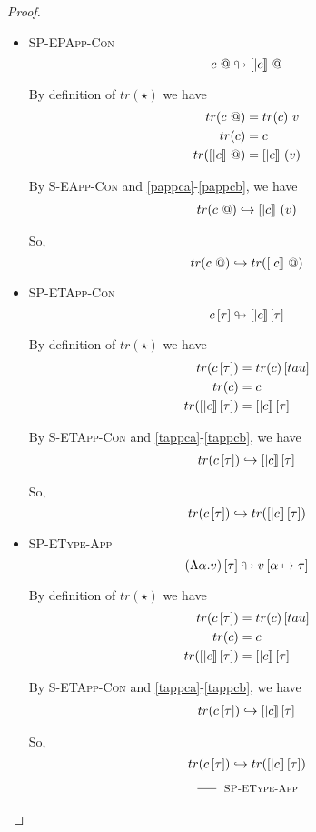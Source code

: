 \documentclass[10pt,a4paper]{article}
\newcommand\trans[1]{\ensuremath{tr (#1)}}
\newcommand\rulename[1]{\textsc{#1}}
\newcommand\peval[2]{\ensuremath{#1 \looparrowright #2 }}
\newcommand\eval[2]{\ensuremath{#1 \hookrightarrow #2 }}
\begin{document}
\begin{proof}
\begin{itemize}
\item \rulename{SP-EPApp-Con} $$\peval{\epapp{c}}{\epapp{[|c|]}}$$

By definition of \trans{\star} we have 
\begin{align}
\trans{\epapp{c}} &= \eapp{\trans{c}}{v} \label{pappca}\\
\trans{c} &= c \label{pappcb}\\
\trans{\epapp{[|c|]}} &= \eapp{[|c|]}{(v)} \label{pappca}
\end{align}

By  \rulename{S-EApp-Con} and \ref{pappca}-\ref{pappcb}, we have
\begin{align}
\eval{\trans{\epapp{c}}}{\eapp{[|c|]}{(v)}}
\end{align}

So, $$\eval{\trans{\epapp{c}}}{\trans{\epapp{[|c|]}}}$$

\item \rulename{SP-ETApp-Con} $$\peval{\etapp{c}{\tau}}{\etapp{[|c|]}{\tau}}$$

By definition of \trans{\star} we have 
\begin{align}
\trans{\etapp{c}{\tau}} &= \etapp{\trans{c}}{tau} \label{tappca}\\
\trans{c} &= c \label{tappcb}\\
\trans{\etapp{[|c|]}{\tau}} &= \etapp{[|c|]}{\tau} \label{tappca}
\end{align}

By  \rulename{S-ETApp-Con} and \ref{tappca}-\ref{tappcb}, we have
\begin{align}
\eval{\trans{\etapp{c}{\tau}}}{\etapp{[|c|]}{\tau}}
\end{align}

So, $$\eval{\trans{\etapp{c}{\tau}}}{\trans{\etapp{[|c|]}{\tau}}}$$

\item \rulename{SP-EType-App} 
$$\peval{\etapp{(\etabs{\alpha}{v})}{\tau}}{v\sub{\alpha}{\tau}}$$

By definition of \trans{\star} we have 
\begin{align}
\trans{\etapp{c}{\tau}} &= \etapp{\trans{c}}{tau} \label{tappca}\\
\trans{c} &= c \label{tappcb}\\
\trans{\etapp{[|c|]}{\tau}} &= \etapp{[|c|]}{\tau} \label{tappca}
\end{align}

By  \rulename{S-ETApp-Con} and \ref{tappca}-\ref{tappcb}, we have
\begin{align}
\eval{\trans{\etapp{c}{\tau}}}{\etapp{[|c|]}{\tau}}
\end{align}

So, $$\eval{\trans{\etapp{c}{\tau}}}{\trans{\etapp{[|c|]}{\tau}}}$$

$$
\inference{
}{
}[\rulename{SP-EType-App}]
$$


\end{itemize}
\end{proof}
\end{document}
